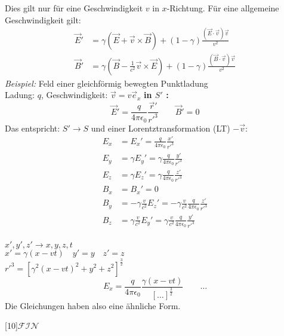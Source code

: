Dies gilt nur für eine Geschwindigkeit $ v $ in $ x $-Richtung. Für eine allgemeine Geschwindigkeit gilt:
\begin{align*}
\vec{E}' &= \gamma (\vec{E} + \vec{v} \times \vec{B}) + (1 - \gamma) \frac{(\vec{E} \cdot \vec{v}) \vec{v}}{v^2} \\
\vec{B}' &= \gamma (\vec{B} - \frac{1}{c^2} \vec{v} \times \vec{E}) + (1 - \gamma) \frac{(\vec{B} \cdot \vec{v}) \vec{v}}{v^2}
\end{align*}
\emph{Beispiel:} Feld einer gleichförmig bewegten Punktladung\\[5pt]
Ladung: $ q $, Geschwindigkeit: $ \vec{v} = v \vec{e}_x $
%
%
%
%
%
%
\textbf{in $ S' $ :}
\begin{equation*}
\vec{E}' = \frac{q}{4 \pi \epsilon_0} \frac{\vec{r}'}{r'^3} \qquad \vec{B}' = 0
\end{equation*}
Das entspricht: $ S' \to S $ und einer Lorentztransformation (LT) $ - \vec{v} $:\\
\begin{align*}
E_x &= E_x' = \frac{q}{4 \pi \epsilon_0} \frac{x'}{r'^3} \\
E_y &= \gamma E_y' = \gamma \frac{q}{4 \pi \epsilon_0} \frac{y'}{r'^3} \\
E_z &= \gamma E_z' = \gamma \frac{q}{4 \pi \epsilon_0} \frac{z'}{r'^3} \\[5pt]
B_x &= B_x' = 0 \\
B_y &= - \gamma \frac{v}{c^2} E_z' = - \gamma \frac{v}{c^2} \frac{q}{4 \pi \epsilon_0} \frac{z'}{r'^3} \\
B_z &= \gamma \frac{v}{c^2} E_y' = \gamma \frac{v}{c^2} \frac{q}{4 \pi \epsilon_0} \frac{y'}{r'^3}
\end{align*}
\\[5pt]
$ x', y', z' \to x, y, z, t $\\
$ x' = \gamma (x - vt) \quad y' = y \quad z' = z $\\
$ r'^3 = \left[\gamma^2 (x-vt)^2 + y^2 + z^2\right]^{\frac{3}{2}} $
\begin{equation*}
E_x = \frac{q}{4 \pi \epsilon_0} \frac{\gamma (x - vt)}{\left[ \dots \right]^{\frac{3}{2}}} \qquad \dots
\end{equation*}
Die Gleichungen haben also eine ähnliche Form.
\vspace{100pt}
\begin{center}
	\scalebox{10}[10]{$ \mathcal{FIN} $}
\end{center}
